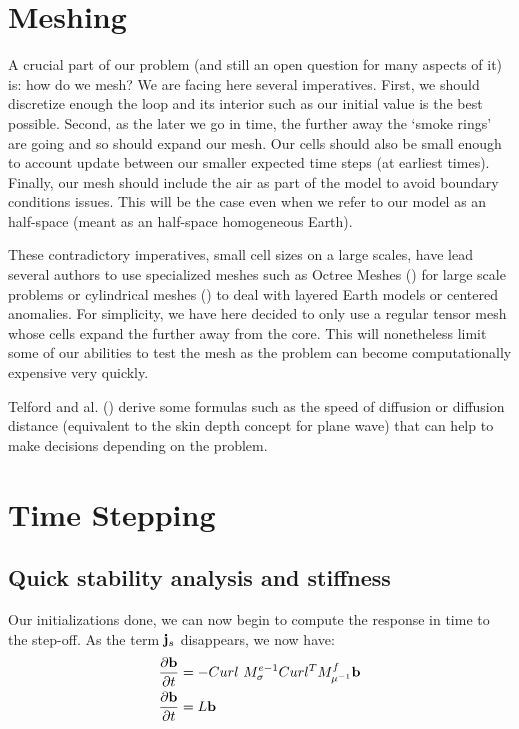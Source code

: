 \documentclass[twoside]{article}
\begin{document}
\section{Meshing}

A crucial part of our problem (and still an open question for many aspects of it) is: how do we mesh? We are facing here several imperatives. First, we should discretize enough the loop and its interior such as our initial value is the best possible. Second, as the later we go in time, the further away the `smoke rings' are going and so should expand our mesh. Our cells should also be small enough to account update between our smaller expected time steps (at earliest times). Finally, our mesh should include the air as part of the model to avoid boundary conditions issues. This will be the case even when we refer to our model as an half-space (meant as an half-space homogeneous Earth).

These contradictory imperatives, small cell sizes on a large scales, have lead several authors to use specialized meshes such as Octree Meshes (\cite{Haber2007}) for large scale problems or cylindrical meshes (\cite{SimPEGEM}) to deal with layered Earth models or centered anomalies. For simplicity, we have here decided to only use a regular tensor mesh whose cells expand the further away from the core. This will nonetheless limit some of our abilities to test the mesh as the problem can become computationally expensive very quickly.

Telford and al. (\cite{Telford}) derive some formulas such as the speed of diffusion or diffusion distance (equivalent to the skin depth concept for plane wave) that can help to make decisions depending on the problem.

\section{Time Stepping}

\subsection{Quick stability analysis and stiffness}
Our initializations done, we can now begin to compute the response in time to the step-off. As the term ${\bf j}_s$ disappears, we now have:
\begin{align}
\frac{ \partial {\bf b}}{\partial t} & = -Curl~ M_{\sigma}^{e-1} Curl^T M_{\mu^{-1}}^f {\bf b} \label{PDE_B}\\
\frac{ \partial {\bf b}}{\partial t} & = L {\bf b}
\end{align}
\end{document}
